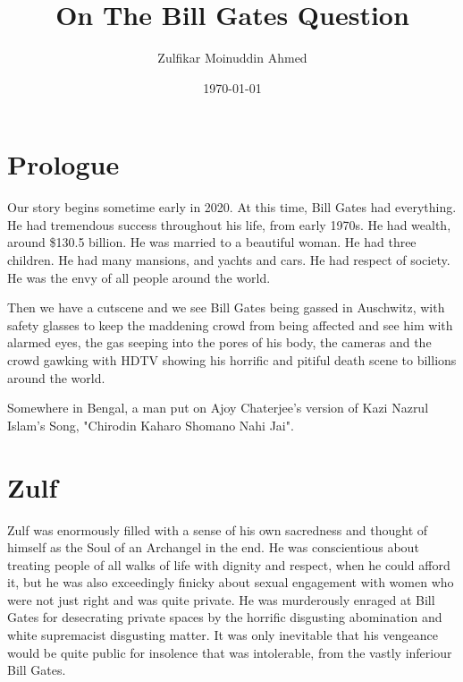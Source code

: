 \documentclass{amsart}
\title{On The Bill Gates Question}
\author{Zulfikar Moinuddin Ahmed}
\date{\today}
\begin{document}
\maketitle

\section{Prologue}

Our story begins sometime early in 2020.  At this time, Bill Gates had everything.  He had tremendous success throughout his life, from early 1970s.  He had wealth, around \$130.5 billion. He was married to a beautiful woman.  He had three children.  He had many mansions, and yachts and cars.  He had respect of society.  He was the envy of all people around the world.

Then we have a cutscene and we see Bill Gates being gassed in Auschwitz, with safety glasses to keep the maddening crowd from being affected and see him with alarmed eyes, the gas seeping into the pores of his body, the cameras and the crowd gawking with HDTV showing his horrific and pitiful death scene to billions around the world.

Somewhere in Bengal, a man put on Ajoy Chaterjee's version of Kazi Nazrul Islam's Song, "Chirodin Kaharo Shomano Nahi Jai".

\section{Zulf}

Zulf was enormously filled with a sense of his own sacredness and thought of himself as the Soul of an Archangel in the end.  He was conscientious about treating people of all walks of life with dignity and respect, when he could afford it, but he was also exceedingly finicky about sexual engagement with women who were not just right and was quite private.  He was murderously enraged at Bill Gates for desecrating private spaces by the horrific disgusting abomination and white supremacist disgusting matter.  It was only inevitable that his vengeance would be quite public for insolence that was intolerable, from the vastly inferiour Bill Gates.
\end{document}
